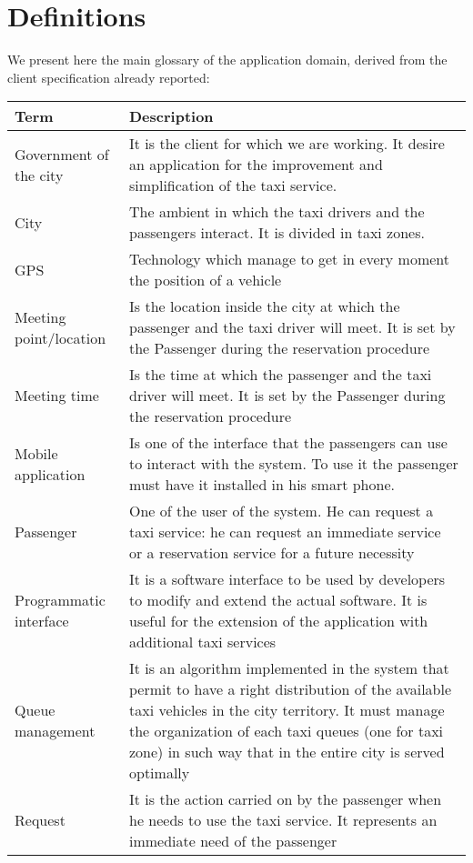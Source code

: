 \section{Definitions}
We present here the main glossary of the application domain, derived from the client specification already reported:
\begin{table}[]
\centering
\begin{tabularx}{\textwidth}{|l|X|} \hline
{\Large \textbf{Term}} & {\Large \textbf{Description}} \\ \hline
Government of the city & It is the client for which we are working.  It desire an application for the improvement and simplification of the taxi service. \\ \hline
City & The ambient in which the taxi drivers and the passengers interact. It is divided in taxi zones. \\ \hline
GPS & Technology which manage to get in every moment the position of a vehicle \\ \hline
Meeting point/location & Is the location inside the city at which the passenger and the taxi driver will meet. It is set by the Passenger during the reservation procedure \\ \hline
Meeting time & Is the time at which the passenger and the taxi driver will meet. It is set by the Passenger during the reservation procedure\\ \hline
Mobile application & Is one of the interface that the passengers can use to interact with the system. To use it the passenger must have it installed in his smart phone. \\ \hline
Passenger & One of the user of the system. He can request a taxi service: he can request an immediate service or a reservation service for a future necessity \\ \hline
Programmatic interface & It is a software interface to be used by developers to modify and extend the actual software. It is useful for the extension of the application with additional taxi services \\ \hline
Queue management & It is an algorithm implemented in the system that permit to have a right distribution of the available taxi vehicles in the city territory. It must manage the organization of each taxi queues (one for taxi zone) in such way that in the entire city is served optimally \\ \hline
Request & It is the action carried on by the passenger when he needs to use the taxi service. It represents an immediate need of the passenger \\ \hline

\end{tabularx}
\end{table}
